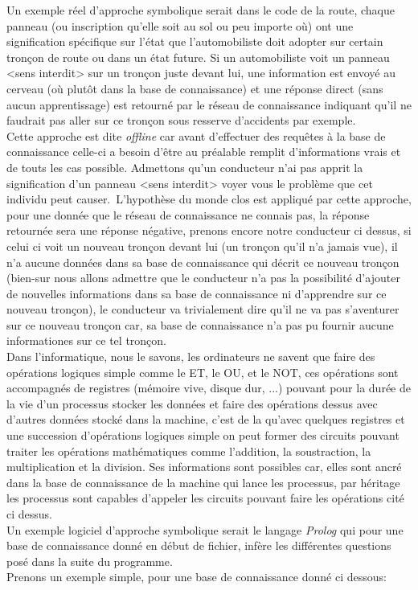 Un exemple réel d'approche symbolique serait dans le code de la route, chaque panneau (ou inscription qu'elle soit au sol ou peu importe où) ont une signification spécifique sur l'état que l'automobiliste doit adopter sur certain tronçon de route ou dans un état future. Si un automobiliste voit un panneau <sens interdit> sur un tronçon juste devant lui, une information est envoyé au cerveau (où plutôt dans la base de connaissance) et une réponse direct (sans aucun apprentissage) est retourné par le réseau de connaissance indiquant qu'il ne faudrait pas aller sur ce tronçon sous resserve d'accidents par exemple.\\
Cette approche est dite \textit{offline}  car avant d'effectuer des requêtes à la base de connaissance celle-ci a besoin d'être au préalable remplit d'informations vrais et de touts les cas possible. Admettons qu'un conducteur n'ai pas apprit la signification d'un panneau <sens interdit> voyer vous le problème que cet individu peut causer.\ L'hypothèse du monde clos est appliqué par cette approche, pour une donnée que le réseau de connaissance ne connais pas, la réponse retournée sera une réponse négative, prenons encore notre conducteur ci dessus, si celui ci voit un nouveau tronçon devant lui (un tronçon qu'il n'a jamais vue), il n'a aucune données dans sa base de connaissance qui décrit ce nouveau tronçon (bien-sur nous allons admettre que le conducteur n'a pas la possibilité d'ajouter de nouvelles informations dans sa base de connaissance ni d'apprendre sur ce nouveau tronçon), le conducteur va trivialement dire qu'il ne va pas s'aventurer sur ce nouveau tronçon car, sa base de connaissance n'a pas pu fournir aucune informationes sur ce tel tronçon. \\
\linebreak
Dans l'informatique, nous le savons, les ordinateurs ne savent que faire des opérations logiques simple comme le ET, le OU, et le NOT, ces opérations sont accompagnés de registres (mémoire vive, disque dur, ...) pouvant pour la durée de la vie d'un processus stocker les données et faire des opérations dessus avec d'autres données stocké dans la machine, c'est de la qu'avec quelques registres et une succession d'opérations logiques simple on peut former des circuits pouvant traiter les opérations mathématiques comme l'addition, la soustraction, la multiplication et la division. Ses informations sont possibles car, elles sont ancré dans la base de connaissance de la machine qui lance les processus, par héritage les processus sont capables d'appeler les circuits pouvant faire les opérations cité ci dessus. \\ Un exemple logiciel d'approche symbolique serait le langage \textit{Prolog} qui pour une base de connaissance donné en début de fichier, infère les différentes questions posé dans la suite du programme.\\ Prenons un exemple simple, pour une base de connaissance donné ci dessous:
